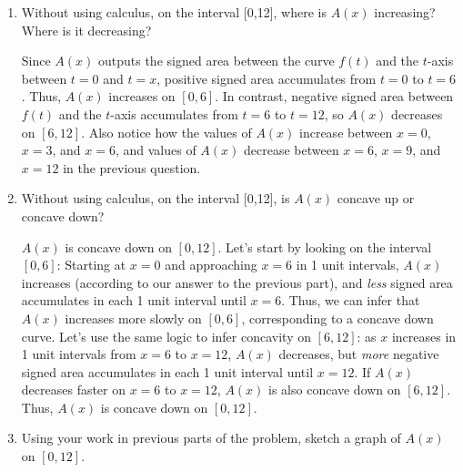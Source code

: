 \documentclass{article}
\begin{document}
\begin{enumerate}
\begin{enumerate}
\vfill 
\item Without using calculus, on the interval [0,12], where is $A(x)$ increasing? Where is it decreasing?

\begin{solution}
Since $A(x)$ outputs the signed area between the curve $f(t)$ and the $t$-axis between $t=0$ and $t=x$, positive signed area accumulates from $t=0$ to $t=6$. Thus, $A(x)$ increases on $[0,6]$. In contrast, negative signed area between $f(t)$ and the $t$-axis accumulates from $t=6$ to $t=12$, so $A(x)$ decreases on $[6,12]$. Also notice how the values of $A(x)$ increase between $x=0$, $x=3$, and $x=6$, and values of $A(x)$ decrease between $x=6$, $x=9$, and $x=12$ in the previous question.
\end{solution}
\vfill
\vfill
\item Without using calculus, on the interval [0,12], is $A(x)$ concave up or concave down?

\begin{solution}
    $A(x)$ is concave down on $[0,12]$. Let's start by looking on the interval $[0,6]$: Starting at $x=0$ and approaching $x=6$ in 1 unit intervals, $A(x)$ increases (according to our answer to the previous part), and \textit{less} signed area accumulates in each 1 unit interval until $x=6$. Thus, we can infer that $A(x)$ increases more slowly on $[0,6]$, corresponding to a concave down curve. Let's use the same logic to infer concavity on $[6,12]$: as $x$ increases in 1 unit intervals from $x=6$ to $x=12$, $A(x)$ decreases, but \textit{more} negative signed area accumulates in each 1 unit interval until $x=12$. If $A(x)$ decreases faster on $x=6$ to $x=12$, $A(x)$ is also concave down on $[6,12]$. Thus, $A(x)$ is concave down on $[0,12]$.
    \end{solution}
\vfill
\vfill
\item Using your work in previous parts of the problem, sketch a graph of $A(x)$ on $[0,12]$.

\begin{solution}
    \begin{center}
    \end{center}
\end{solution}
\vfill
\vfill
\vfill


\end{enumerate}
\end{enumerate}
\end{document}
